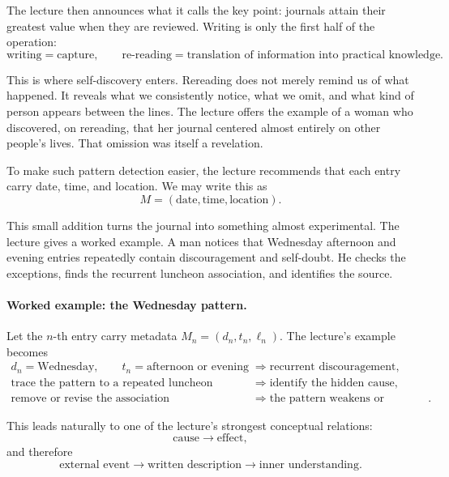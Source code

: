 The lecture then announces what it calls the key point: journals attain their greatest value when they are reviewed. Writing is only the first half of the operation:
\begin{equation}
\text{writing}=\text{capture},\qquad
\text{re-reading}=\text{translation of information into practical knowledge}.
\end{equation}

This is where self-discovery enters. Rereading does not merely remind us of what happened. It reveals what we consistently notice, what we omit, and what kind of person appears between the lines. The lecture offers the example of a woman who discovered, on rereading, that her journal centered almost entirely on other people's lives. That omission was itself a revelation.

To make such pattern detection easier, the lecture recommends that each entry carry date, time, and location. We may write this as
\begin{equation}
M=(\text{date},\text{time},\text{location}).
\end{equation}

This small addition turns the journal into something almost experimental. The lecture gives a worked example. A man notices that Wednesday afternoon and evening entries repeatedly contain discouragement and self-doubt. He checks the exceptions, finds the recurrent luncheon association, and identifies the source.

\paragraph{Worked example: the Wednesday pattern.}
Let the \(n\)-th entry carry metadata \(M_n=(d_n,t_n,\ell_n)\). The lecture's example becomes
\begin{align}
d_n=\text{Wednesday},\qquad t_n=\text{afternoon or evening}
&\Longrightarrow \text{recurrent discouragement},\\
\text{trace the pattern to a repeated luncheon association}
&\Longrightarrow \text{identify the hidden cause},\\
\text{remove or revise the association}
&\Longrightarrow \text{the pattern weakens or disappears}.
\end{align}

This leads naturally to one of the lecture's strongest conceptual relations:
\begin{equation}
\text{cause}\rightarrow \text{effect},
\end{equation}
and therefore
\begin{equation}
\text{external event}\rightarrow \text{written description}\rightarrow \text{inner understanding}.
\end{equation}

